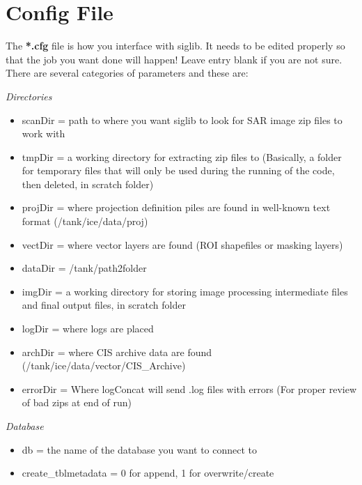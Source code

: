 \documentclass[letterpaper,10pt,openany,oneside]{sphinxmanual}
\begin{document}
\section{Config File}
\label{project:config-file}
The \textbf{*.cfg} file is how you interface with siglib. It needs to be
edited properly so that the job you want done will happen! Leave entry
blank if you are not sure. There are several categories of parameters
and these are:

\emph{Directories}
\begin{itemize}
\item {} 
scanDir = path to where you want siglib to look for SAR image zip
files to work with

\item {} 
tmpDir = a working directory for extracting zip files to (Basically,
a folder for temporary files that will only be used during the
running of the code, then deleted, in scratch folder)

\item {} 
projDir = where projection definition piles are found in well-known
text format (/tank/ice/data/proj)

\item {} 
vectDir = where vector layers are found (ROI shapefiles or masking
layers)

\item {} 
dataDir = /tank/path2folder

\item {} 
imgDir = a working directory for storing image processing
intermediate files and final output files, in scratch folder

\item {} 
logDir = where logs are placed

\item {} 
archDir = where CIS archive data are found
(/tank/ice/data/vector/CIS\_Archive)

\item {} 
errorDir = Where logConcat will send .log files with errors (For
proper review of bad zips at end of run)

\end{itemize}

\emph{Database}
\begin{itemize}
\item {} 
db = the name of the database you want to connect to

\item {} 
create\_tblmetadata = 0 for append, 1 for overwrite/create

\end{itemize}
\end{document}
